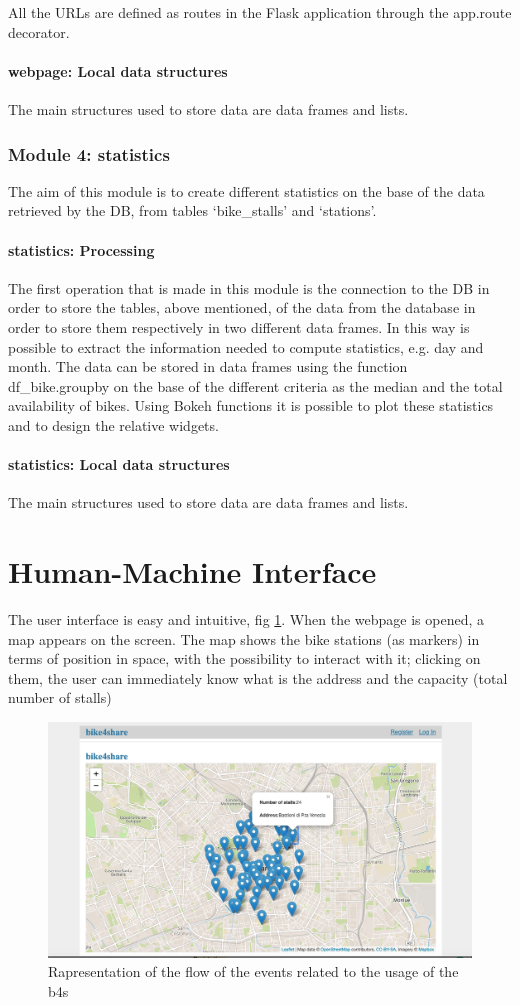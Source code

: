 \documentclass{article}
\begin{document}
All the URLs are defined as routes in the Flask application through the app.route decorator. 
\paragraph{webpage: Local data structures}
The main structures used to store data are data frames and lists.

\subsubsection{Module 4: statistics}
The aim of  this module is to create different statistics on the base of the data retrieved by the DB, from tables ‘bike\_stalls’ and ‘stations’.
\paragraph{statistics: Processing}
The first operation that is made in this module is the connection to the DB in order to store the tables, above mentioned,  of the data from the database in order to store them respectively in two different data frames. In this way is possible to extract the information needed to compute statistics, e.g. day and month. The data can be stored in data frames using the function df\_bike.groupby on the base of the different criteria as the median and the total availability of bikes. Using Bokeh functions it is possible to plot these statistics and to design the relative widgets. 
\paragraph{statistics: Local data structures}
The main structures used to store data are data frames and lists.
\section{Human-Machine Interface}
The user interface is easy and intuitive, fig \ref{fig:usageb4s}. When the webpage is opened, a map appears on the screen. The map shows the bike stations (as markers) in terms of position in space, with the possibility to interact with it; clicking on them, the user can immediately know what is the address and the capacity (total number of stalls)
\\
\begin{figure}[H]
    \centering
    \includegraphics[width=0.8\linewidth]{image/map.png}
    \caption{Rapresentation of the flow of the events related to the usage of the b4s}
    \label{fig:usageb4s}
\end{figure}
\end{document}
